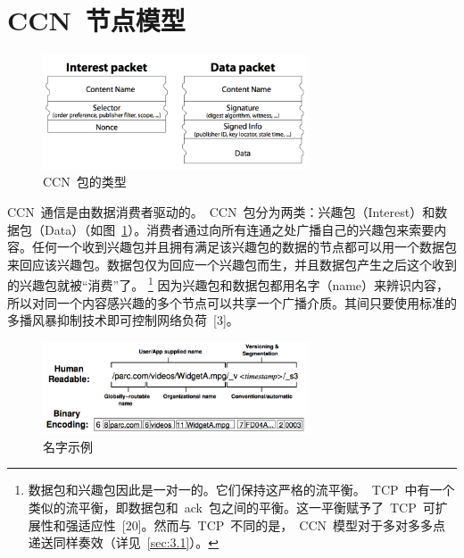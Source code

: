\section{CCN~节点模型}
\label{sec:2}

\begin{figure}
  \centering
  \includegraphics[width=0.7\textwidth]{images/packet_types}
  \caption{CCN~包的类型} 
  \label{packet_types}
\end{figure}

CCN~通信是由数据消费者驱动的。~CCN~包分为两类：兴趣包（Interest）和数据包（Data）（如图~\ref{packet_types}）。消费者通过向所有连通之处广播自己的兴趣包来索要内容。任何一个收到兴趣包并且拥有满足该兴趣包的数据的节点都可以用一个数据包来回应该兴趣包。数据包仅为回应一个兴趣包而生，并且数据包产生之后这个收到的兴趣包就被“消费”了。
\renewcommand\baselinestretch{1} %
\footnote{数据包和兴趣包因此是一对一的。它们保持这严格的流平衡。~TCP~中有一个类似的流平衡，即数据包和~ack~包之间的平衡。这一平衡赋予了~TCP~可扩展性和强适应性~[20]。然而与~TCP~不同的是，~CCN~模型对于多对多多点递送同样奏效（详见~\ref{sec:3.1}）。}
因为兴趣包和数据包都用名字（name）来辨识内容，所以对同一个内容感兴趣的多个节点可以共享一个广播介质。其间只要使用标准的多播风暴抑制技术即可控制网络负荷~[3]。%

\begin{figure}
  \centering
  \includegraphics[width=0.7\textwidth]{images/name}
  \caption{名字示例} 
  \label{name}
\end{figure}


